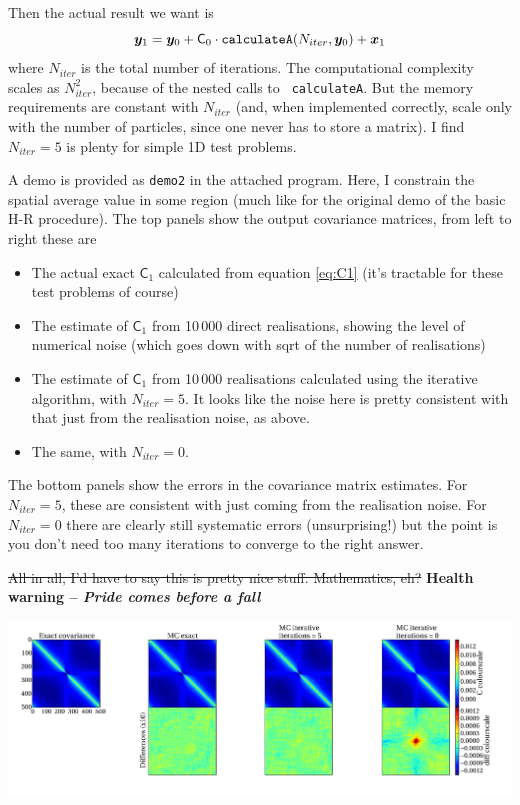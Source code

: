 \documentclass[11pt,a4paper,preprint]{aastex}
\newcommand{\bmath}[1]{\ensuremath{\bm{#1}}}
\renewcommand{\vec}[1]{\bmath{#1}}
\begin{document}
Then the actual result we want is
\begin{equation}
\vec{y}_1 = \vec{y}_0 + \mathsf{C}_0 \cdot {\tt
  calculateA}(N_{iter},\vec{y}_0) + \vec{x}_1
\end{equation}
where $N_{iter}$ is the total number of iterations. The computational
complexity scales as $N_{iter}^2$, because of the nested calls to {\tt
  calculateA}. But the memory requirements are constant with
$N_{iter}$ (and, when implemented correctly, scale only with the
number of particles, since one never has to store a matrix). I find
$N_{iter}=5$ is plenty for simple 1D test problems.

A demo is provided as {\tt demo2} in the attached program. Here, I
constrain the spatial average value in some region (much like for the
original demo of the basic H-R procedure). The top panels show the
output covariance matrices, from left to right these are
\begin{itemize}
\item The actual exact $\mathsf{C}_1$ calculated from equation
  \eqref{eq:C1} (it's tractable for these test problems of course)
\item The estimate of $\mathsf{C}_1$ from 10\,000 direct realisations,
  showing the level of numerical noise (which goes down with sqrt of
  the number of realisations)
\item The estimate of $\mathsf{C}_1$ from 10\,000 realisations
  calculated using the iterative algorithm, with $N_{iter}=5$. It
  looks like the noise here is pretty consistent with that just from
  the realisation noise, as above.
\item The same, with $N_{iter}=0$. 
\end{itemize}

The bottom panels show the errors in the covariance matrix
estimates. For $N_{iter}=5$, these are consistent with just coming
from the realisation noise. For $N_{iter}=0$ there are clearly still
systematic errors (unsurprising!) but the point is you don't need too
many iterations to converge to the right answer.

\st{All in all, I'd have to say this is pretty nice
  stuff. Mathematics, eh?} {\bf Health warning -- \it Pride comes before a fall}

\begin{center}
\includegraphics[width=1.1\textwidth]{figs/HR-approx-demo.pdf}
\end{center}
\end{document}
